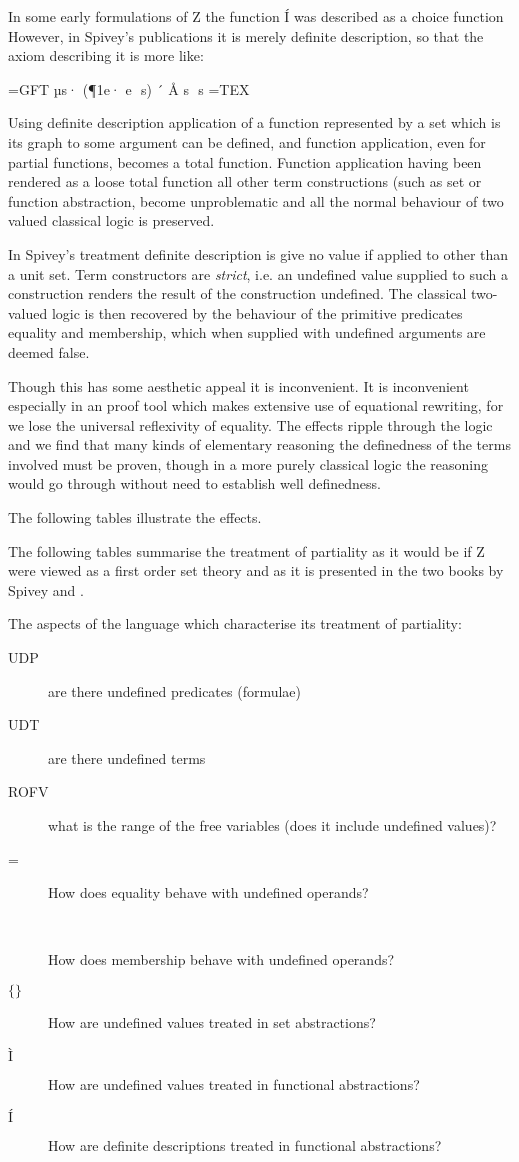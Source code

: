 \documentclass[10pt,titlepage]{book}
\begin{document}
In some early formulations of Z the function $Í$ was described as a choice function 
However, in Spivey's publications it is merely definite description, so that the axiom describing it is more like:

=GFT
	µs· (¶1e· e  s) ´ Å s  s
=TEX

Using definite description application of a function represented by a set which is its graph to some argument can be defined, and function application, even for partial functions, becomes a total function.
Function application having been rendered as a loose total function all other term constructions (such as set or function abstraction, become unproblematic and all the normal behaviour of two valued classical logic is preserved.

In Spivey's treatment definite description is give no value if applied to other than a unit set.
Term constructors are {\it strict}, i.e. an undefined value supplied to such a construction renders the result of the construction undefined.
The classical two-valued logic is then recovered by the behaviour of the primitive predicates equality and membership, which when supplied with undefined arguments are deemed false.

Though this has some aesthetic appeal it is inconvenient.
It is inconvenient especially in an proof tool which makes extensive use of equational rewriting, for we lose the universal reflexivity of equality.
The effects ripple through the logic and we find that many kinds of elementary reasoning the definedness of the terms involved must be proven, though in a more purely classical logic the reasoning would go through without need to establish well definedness.

The following tables illustrate the effects.

The following tables summarise the treatment of partiality as it would be if Z were viewed as a first order set theory and as it is presented in the two books by Spivey \cite{spivey88} and \cite{spivey89}.

The aspects of the language which characterise its treatment of partiality:

\begin{description}
\item[UDP] are there undefined predicates (formulae)
\item[UDT] are there undefined terms
\item[ROFV] what is the range of the free variables (does it include undefined values)?
\item[=] How does equality behave with undefined operands?
\item[] How does membership behave with undefined operands?
\item[$\{\}$] How are undefined values treated in set abstractions?
\item[$Ì$] How are undefined values treated in functional abstractions?
\item[$Í$] How are definite descriptions treated in functional abstractions?
\end{description}
\end{document}
